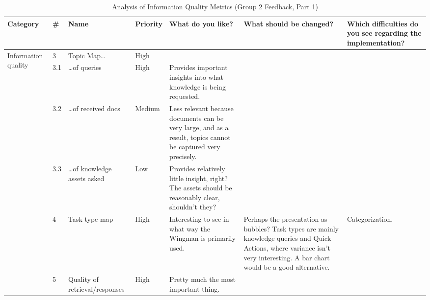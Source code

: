 \documentclass[
	english,
	ruledheaders=section,%
	class=report,%
	thesis={type=bachelor},%
	accentcolor=1b,%
	custommargins=true,%
	marginpar=false,%
	parskip=half-,%
	fontsize=11pt,%
	DIV=14,
]{tudapub}
\begin{document}
\begin{table}
    \centering
    \small 
    \caption{Analysis of Information Quality Metrics (Group 2 Feedback, Part 1)}
    \label{tab:info_quality_g2_p1}
    \begin{tabularx}{\textheight}{p{2.2cm} l >{\RaggedRight\arraybackslash}X l >{\RaggedRight\arraybackslash}X >{\RaggedRight\arraybackslash}X >{\RaggedRight\arraybackslash}X}
        \toprule
        \textbf{Category} & \textbf{\#} & \textbf{Name} & \textbf{Priority} & \textbf{What do you like?} & \textbf{What should be changed?} & \textbf{Which difficulties do you see regarding the implementation?} \\
        \midrule

        \multirow{6}{=}{Information quality} 
        & 3 & Topic Map\dots & High & & & \\
        \cmidrule(l){2-7}
        & 3.1 & \dots of queries & High & Provides important insights into what knowledge is being requested. & & \\
        \cmidrule(l){2-7}
        & 3.2 & \dots of received docs & Medium & Less relevant because documents can be very large, and as a result, topics cannot be captured very precisely. & & \\
        \cmidrule(l){2-7}
        & 3.3 & \dots of knowledge assets asked & Low & Provides relatively little insight, right? The assets should be reasonably clear, shouldn't they? & & \\
        \cmidrule(l){2-7}
        & 4 & Task type map & High & Interesting to see in what way the Wingman is primarily used. & Perhaps the presentation as bubbles? Task types are mainly knowledge queries and Quick Actions, where variance isn't very interesting. A bar chart would be a good alternative. & Categorization. \\
        \cmidrule(l){2-7}
        & 5 & Quality of retrieval/responses & High & Pretty much the most important thing. & & \\
        \bottomrule
    \end{tabularx}
\end{table}
\end{document}
